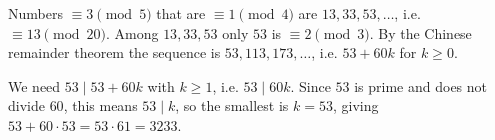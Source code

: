 Numbers $\equiv3\pmod5$ that are $\equiv1\pmod4$ are $13,33,53,\dots$, i.e. $\equiv13\pmod{20}$. Among $13,33,53$ only $53$ is $\equiv2\pmod3$. By the Chinese remainder theorem the sequence is $53,113,173,\dots$, i.e. $53+60k$ for $k\ge0$.

We need $53\mid53+60k$ with $k\ge1$, i.e. $53\mid60k$. Since $53$ is prime and does not divide $60$, this means $53\mid k$, so the smallest is $k=53$, giving $53+60\cdot53=53\cdot61=\boxed{3233}$.
